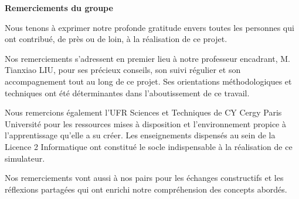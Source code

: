 \clearpage
\thispagestyle{empty}

\vspace*{2cm}

\begin{center}
{\LARGE\bfseries Remerciements du groupe}
\end{center}

\vspace{2cm}

\begin{flushleft}

 Nous tenons à exprimer notre profonde gratitude envers toutes les personnes qui ont contribué, de près ou de loin, à la réalisation de ce projet.

\vspace{1.5cm}

Nos remerciements s'adressent en premier lieu à notre professeur encadrant, M. Tianxiao LIU, pour ses précieux conseils, son suivi régulier et son accompagnement tout au long de ce projet. Ses orientations méthodologiques et techniques ont été déterminantes dans l'aboutissement de ce travail.

\vspace{1cm}

Nous remercions également l'UFR Sciences et Techniques de CY Cergy Paris Université pour les ressources mises à disposition et l'environnement propice à l'apprentissage qu'elle a su créer. Les enseignements dispensés au sein de la Licence 2 Informatique ont constitué le socle indispensable à la réalisation de ce simulateur.

\vspace{1cm}

Nos remerciements vont aussi à nos pairs pour les échanges constructifs et les réflexions partagées qui ont enrichi notre compréhension des concepts abordés.

\end{flushleft}

\vspace{2cm}